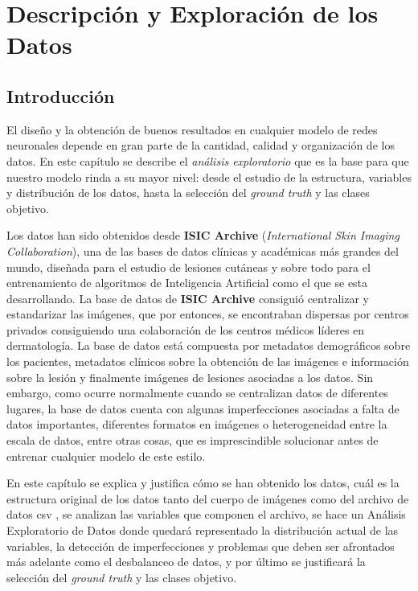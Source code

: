 

\chapter{Descripción y Exploración de los Datos}

\section{Introducción}
El diseño y la obtención de buenos resultados en cualquier modelo de redes neuronales depende en gran parte de la cantidad, calidad y organización de los datos. En este capítulo se describe el \emph{análisis exploratorio} que es la base para que nuestro modelo rinda a su mayor nivel: desde el estudio de la estructura, variables y distribución de los datos, hasta la selección del \textit{ground truth} y las clases objetivo.

Los datos han sido obtenidos desde \textbf{ISIC Archive} (\textit{International Skin Imaging Collaboration}), una de las bases de datos clínicas y académicas más grandes del mundo, diseñada para el estudio de lesiones cutáneas y sobre todo para el entrenamiento de algoritmos de Inteligencia Artificial como el que se esta desarrollando. La base de datos de \textbf{ISIC Archive} consiguió centralizar y estandarizar las imágenes, que por entonces, se encontraban dispersas por centros privados consiguiendo una colaboración de los centros médicos líderes en dermatología. La base de datos está compuesta por metadatos demográficos sobre los pacientes, metadatos clínicos sobre la obtención de las imágenes e información sobre la lesión y finalmente imágenes de lesiones asociadas a los datos. Sin embargo, como ocurre normalmente cuando se centralizan datos de diferentes lugares, la base de datos cuenta con algunas imperfecciones asociadas a falta de datos importantes, diferentes formatos en imágenes o heterogeneidad entre la escala de datos, entre otras cosas, que es imprescindible solucionar antes de entrenar cualquier modelo de este estilo.

En este capítulo se explica y justifica cómo se han obtenido los datos, cuál es la estructura original de los datos tanto del cuerpo de imágenes como del archivo de datos csv , se analizan las variables que componen el archivo, se hace un Análisis Exploratorio de Datos donde quedará representado la distribución actual de las variables, la detección de imperfecciones y problemas que deben ser afrontados más adelante como el desbalanceo de datos, y por último se justificará la selección del \textit{ground truth} y las clases objetivo. 

